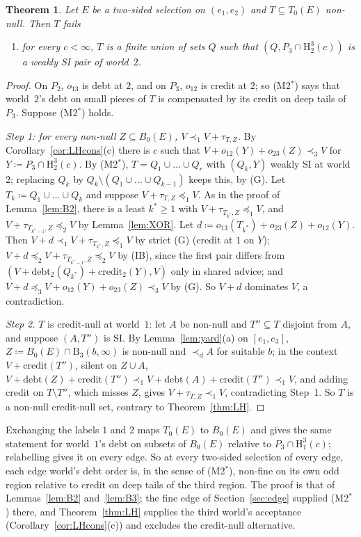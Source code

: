 \documentclass[11pt]{article}
\newtheorem{theorem}{Theorem}
\theoremstyle{definition}\newtheorem{definition}[theorem]{Definition}
\theoremstyle{remark}\newtheorem{remark}[theorem]{Remark}
\newcommand{\debt}{\mathrm{debt}}
\newcommand{\cred}{\mathrm{credit}}
\newcommand{\Band}{\mathrm{B}}
\newcommand{\Hi}[3]{\mathrm H^{#1}_{#2}(#3)}
\begin{document}
\begin{theorem}\label{thm:ownregion}
Let $E$ be a two-sided selection on $(e_1,e_2)$ and $T\subseteq T_0(E)$
non-null. Then $T$ fails
\begin{enumerate}[label=(M2$^*$),leftmargin=*]
\item for every $c<\infty$, $T$ is a finite union of sets $Q$ such that
$(Q,P_3\cap\Hi32c)$ is a weakly SI pair of world~$2$.
\end{enumerate}
\end{theorem}
\begin{proof}
On $P_2$, $o_{13}$ is debt at $2$, and on $P_3$, $o_{12}$ is credit at $2$;
so (M2$^*$) says that world~$2$'s debt on small pieces of $T$ is compensated by
its credit on deep tails of $P_3$. Suppose (M2$^*$) holds.

\emph{Step 1: for every non-null $Z\subseteq B_0(E)$,
$V\prec_1V+\tau_{T,Z}$.} By Corollary~\ref{cor:LHcons}(c) there is $c$ such
that $V+o_{12}(Y)+o_{23}(Z)\prec_3V$ for $Y\coloneqq P_3\cap\Hi32c$. By
(M2$^*$), $T=Q_1\cup\dots\cup Q_r$ with $(Q_k,Y)$ weakly SI at world~$2$;
replacing $Q_k$ by $Q_k\setminus(Q_1\cup\dots\cup Q_{k-1})$ keeps this, by
(G). Let $T_k\coloneqq Q_1\cup\dots\cup Q_k$ and suppose
$V+\tau_{T,Z}\preceq_1V$. As in the proof of Lemma~\ref{lem:B2}, there is a
least $k^*\ge1$ with $V+\tau_{T_{k^*},Z}\preceq_1V$, and
$V+\tau_{T_{k^*-1},Z}\preceq_2V$ by Lemma~\ref{lem:XOR}. Let
$d\coloneqq o_{13}(T_{k^*})+o_{23}(Z)+o_{12}(Y)$. Then
$V+d\prec_1V+\tau_{T_{k^*},Z}\preceq_1V$ by strict (G) (credit at $1$ on $Y$);
$V+d\preceq_2V+\tau_{T_{k^*-1},Z}\preceq_2V$ by (IB), since the first pair
differs from $(V+\debt_2(Q_{k^*})+\cred_2(Y),V)$ only in shared advice; and
$V+d\preceq_3V+o_{12}(Y)+o_{23}(Z)\prec_3V$ by (G). So $V+d$ dominates $V$, a
contradiction.

\emph{Step 2.} $T$ is credit-null at world~$1$: let $A$ be non-null and
$T''\subseteq T$ disjoint from $A$, and suppose $(A,T'')$ is SI. By
Lemma~\ref{lem:yard}(a) on $[e_1,e_3]$, $Z\coloneqq B_0(E)\cap
\Band_3(b,\infty)$ is non-null and $\prec_dA$ for suitable $b$; in the context
$V+\cred(T'')$, silent on $Z\cup A$, $V+\debt(Z)+\cred(T'')\prec_1
V+\debt(A)+\cred(T'')\prec_1V$, and adding credit on $T\setminus T''$, which
misses $Z$, gives $V+\tau_{T,Z}\prec_1V$, contradicting Step~1. So $T$ is a
non-null credit-null set, contrary to Theorem~\ref{thm:LH}.
\end{proof}

Exchanging the labels $1$ and $2$ maps $T_0(E)$ to $B_0(E)$ and gives the
same statement for world~$1$'s debt on subsets of $B_0(E)$ relative to
$P_3\cap\Hi31c$; relabelling gives it on every edge. So at every two-sided
selection of every edge, each edge world's debt order is, in the sense of
(M2$^*$), non-fine on its own odd region relative to credit on deep tails of
the third region. The proof
is that of Lemmas~\ref{lem:B2} and~\ref{lem:B3}; the fine edge of
Section~\ref{sec:edge} supplied (M2$^*$) there, and Theorem~\ref{thm:LH}
supplies the third world's acceptance (Corollary~\ref{cor:LHcons}(c)) and
excludes the credit-null alternative.
\end{document}
